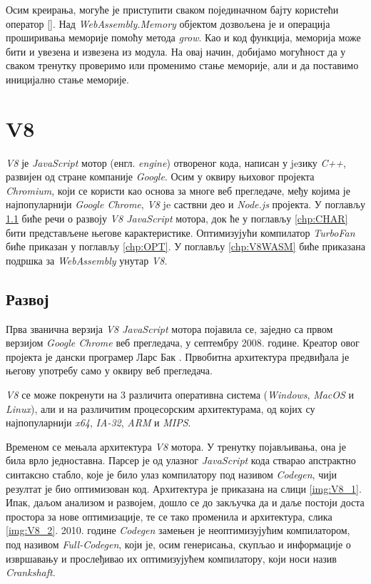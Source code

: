 \documentclass[12pt,oneside]{memoir}
\begin{document}
Осим креирања, могуће је приступити сваком појединачном бајту користећи оператор []. Над \textit{WebAssembly.Memory}
објектом дозвољена је и операција проширивања меморије помоћу метода \textit{grow}. Као и код функција, меморија може бити и увезена и извезена из модула.
На овај начин, добијамо могућност да у сваком тренутку проверимо или променимо стање меморије, али и да поставимо иницијално стање меморије.

\chapter{V8}

\textit{V8} је \textit{JavaScript} мотор (енгл. \textit{engine}) отвореног кода, написан у jeзику \textit{C++},
развијен од стране компаније \textit{Google}. Осим у оквиру њиховог пројекта \textit{Chromium}, који се користи као основа за многе веб прегледаче,
међу којима је најпопуларнији \textit{Google Chrome}, \textit{V8} je саствни део и \textit{Node.js} пројекта. У поглављу \ref{chp:DEV} биће речи о развоју
\textit{V8 JavaScript} мотора, док ће у поглављу \ref{chp:CHAR} бити представљене његове карактеристике. Оптимизујући компилатор \textit{TurboFan}
биће приказан у поглављу \ref{chp:OPT}. У поглављу \ref{chp:V8WASM} биће приказана подршка за \textit{WebAssembly} унутар \textit{V8}.

\section{Развој} \label{chp:DEV}

Прва званична верзија \textit{V8 JavaScript} мотора појавила се, заједно са првом верзијом \textit{Google Chrome} веб прегледача, у септембру 2008. године. Креатор
овог пројекта је дански програмер Ларс Бак \cite{V8SP}. Првобитна архитектура предвиђала је његову употребу само у оквиру веб прегледача.

\textit{V8} се може покренути на 3 различита оперативна система (\textit{Windows}, \textit{MacOS} и \textit{Linux}), али и на различитим процесорским архитектурама, од којих
су најпопуларнији \textit{x64}, \textit{IA-32}, \textit{ARM} и \textit{MIPS}.

Временом се мењала архитектура \textit{V8} мотора. У тренутку појављивања, она је била врло једноставна. Парсер је од улазног \textit{JavaScript} кода стварао апстрактно
синтаксно стабло, које је било улаз компилатору под називом \textit{Codegen}, чији резултат је био оптимизован код. Архитектура је приказана на слици \ref{img:V8_1}.
Ипак, даљом анализом и развојем, дошло се до закључка да и даље постоји доста простора за нове оптимизације, те се тако променила и архитектура, слика \ref{img:V8_2}.
2010. године \textit{Codegen} замењен је неоптимизујућим компилатором, под називом \textit{Full-Codegen}, који је, осим генерисања, скупљао и информације о извршавању и
прослеђивао их оптимизујућем компилатору, који носи назив \textit{Crankshaft}.
\end{document}
